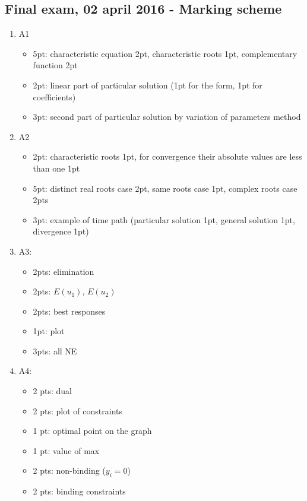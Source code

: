 \subsection{Final exam, 02 april 2016 - Marking scheme}

\begin{enumerate}
\item A1
\begin{itemize}
\item 5pt: characteristic equation 2pt, characteristic roots 1pt, complementary function 2pt
\item 2pt: linear part of particular solution (1pt for the form, 1pt for coefficients)
\item 3pt: second part of particular solution by variation of parameters method
\end{itemize}

\item A2
\begin{itemize}

\item 2pt: characteristic roots 1pt, for convergence their absolute values are less than one 1pt
\item 5pt: distinct real roots case 2pt, same roots case 1pt, complex roots case 2pts
\item 3pt: example of time path (particular solution 1pt, general solution 1pt, divergence 1pt)

\end{itemize}

\item A3:
\begin{itemize}
\item 2pts: elimination
\item 2pts: $E(u_1)$, $E(u_2)$
\item 2pts: best responses
\item 1pt: plot
\item 3pts: all NE
\end{itemize}

\item A4:
\begin{itemize}
\item 2 pts: dual
\item 2 pts: plot of constraints
\item 1 pt: optimal point on the graph
\item 1 pt: value of max
\item 2 pts: non-binding ($y_i=0$)
\item 2 pts: binding constraints
\end{itemize}


\end{enumerate}
